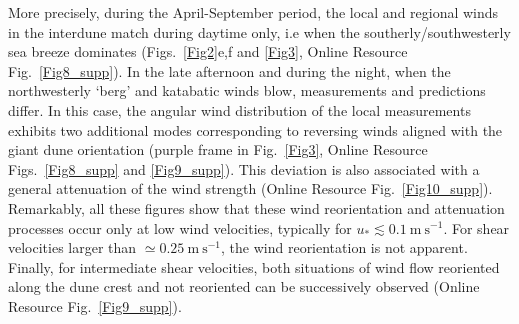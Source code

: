 More precisely, during the April-September period, the local and regional winds in the interdune match during daytime only, i.e when the southerly/southwesterly sea breeze dominates (Figs.~\ref{Fig2}e,f and \ref{Fig3}, Online Resource Fig.~\ref{Fig8_supp}). In the late afternoon and during the night, when the northwesterly `berg' and katabatic winds blow, measurements and predictions differ. In this case, the angular wind distribution of the local measurements exhibits two additional modes corresponding to reversing winds aligned with the giant dune orientation (purple frame in Fig.~\ref{Fig3}, Online Resource Figs.~\ref{Fig8_supp} and \ref{Fig9_supp}). This deviation is also associated with a general attenuation of the wind strength (Online Resource Fig.~\ref{Fig10_supp}). Remarkably, all these figures show that these wind reorientation and attenuation processes occur only at low wind velocities, typically for $u_{*} \lesssim 0.1~\textrm{m}~\textrm{s}^{-1}$. For shear velocities larger than $\simeq 0.25~\textrm{m}~\textrm{s}^{-1}$, the wind reorientation is not apparent. Finally, for intermediate shear velocities, both situations of wind flow reoriented along the dune crest and not reoriented can be successively observed (Online Resource Fig.~\ref{Fig9_supp}).


